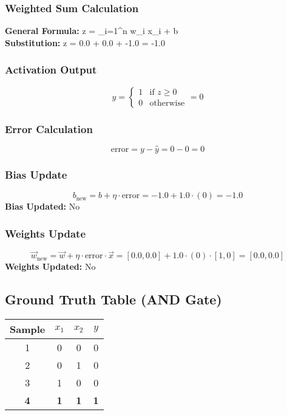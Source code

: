 \documentclass{article}
\begin{document}
\subsubsection*{Weighted Sum Calculation}
\textbf{General Formula:} \quad
z = \sum_{i=1}^{n} w_i x_i + b
\\
\textbf{Substitution:} \quad
z = 0.0  + 0.0  + -1.0 = -1.0

\subsubsection*{Activation Output}
\[
\hat{y} =
\begin{cases}
1 & \text{if } z \geq 0 \\
0 & \text{otherwise}
\end{cases}
= 0
\]

\subsubsection*{Error Calculation}
\[
\text{error} = y - \hat{y} = 0 - 0 = 0
\]

\subsubsection*{Bias Update}
\[
b_{\text{new}} = b + \eta \cdot \text{error} = -1.0 + 1.0 \cdot (0) = -1.0
\]
\textbf{Bias Updated:} No

\subsubsection*{Weights Update}
\[
\vec{w}_{\text{new}} = \vec{w} + \eta \cdot \text{error} \cdot \vec{x} = 
[0.0, 0.0] + 1.0 \cdot (0) \cdot [1, 0] = 
[0.0, 0.0]
\]
\textbf{Weights Updated:} No

\subsection*{Ground Truth Table (AND Gate)}
\begin{center}
\begin{tabular}{|c|c|c|c|}
\hline
\textbf{Sample} & $x_1$ & $x_2$ & $y$ \\
\hline
1 & 0 & 0 & 0 \\
\hline
2 & 0 & 1 & 0 \\
\hline
3 & 1 & 0 & 0 \\
\hline
\rowcolor{yellow} \textbf{4} & \textbf{1} & \textbf{1} & \textbf{1} \\
\hline
\end{tabular}
\end{center}
\end{document}
